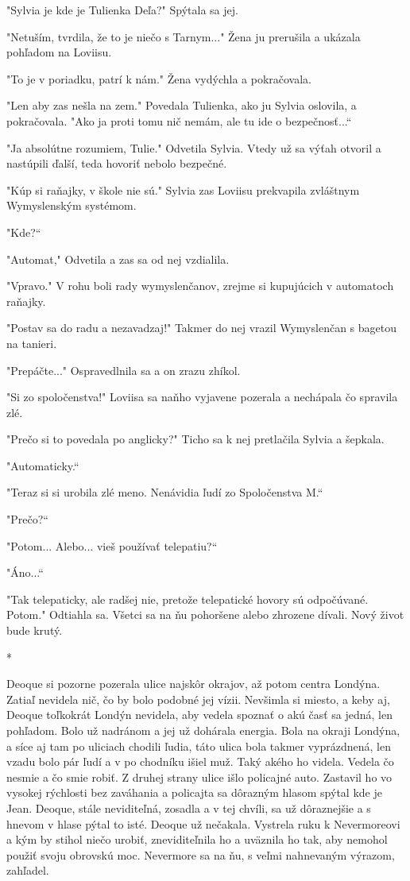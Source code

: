 \documentclass{book}
\begin{document}
"$ $Sylvia je kde je Tulienka Deľa?"$ $ Spýtala sa jej.

"$ $Netuším, tvrdila, že to je niečo s Tarnym..."$ $ Žena ju prerušila a ukázala pohľadom na Loviisu.

"$ $To je v poriadku, patrí k nám."$ $ Žena vydýchla a pokračovala.

"$ $Len aby zas nešla na zem."$ $ Povedala Tulienka, ako ju Sylvia oslovila, a pokračovala. "$ $Ako ja proti tomu nič nemám, ale tu ide o bezpečnosť...“

"$ $Ja absolútne rozumiem, Tulie."$ $ Odvetila Sylvia. Vtedy už sa výťah otvoril a nastúpili ďalší, teda hovoriť nebolo bezpečné.

"$ $Kúp si raňajky, v škole nie sú."$ $ Sylvia zas Loviisu prekvapila zvláštnym Wymyslenským systémom.

"$ $Kde?“

"$ $Automat,"$ $ Odvetila a zas sa od nej vzdialila.

"$ $Vpravo."$ $ V rohu boli rady wymyslenčanov, zrejme si kupujúcich v automatoch raňajky.

"$ $Postav sa do radu a nezavadzaj!"$ $ Takmer do nej vrazil Wymyslenčan s bagetou na tanieri.

"$ $Prepáčte..."$ $ Ospravedlnila sa a on zrazu zhíkol.

"$ $Si zo spoločenstva!"$ $ Loviisa sa naňho vyjavene pozerala a nechápala čo spravila zlé.

"$ $Prečo si to povedala po anglicky?"$ $ Ticho sa k nej pretlačila Sylvia a šepkala.

"$ $Automaticky.“

"$ $Teraz si si urobila zlé meno. Nenávidia ľudí zo Spoločenstva M.“

"$ $Prečo?“

"$ $Potom... Alebo... vieš používať telepatiu?“

"$ $Áno...“

"$ $Tak telepaticky, ale radšej nie, pretože telepatické hovory sú odpočúvané. Potom."$ $ Odtiahla sa. Všetci sa na ňu pohoršene alebo zhrozene dívali. Nový život bude krutý.

\begin{center}
*
\end{center}

Deoque si pozorne pozerala ulice najskôr okrajov, až potom centra Londýna. Zatiaľ nevidela nič, čo by bolo podobné jej vízii. Nevšimla si miesto, a keby aj, Deoque toľkokrát Londýn nevidela, aby vedela spoznať o akú časť sa jedná, len pohľadom. Bolo už nadránom a jej už dohárala energia. Bola na okraji Londýna, a síce aj tam po uliciach chodili ľudia, táto ulica bola takmer vyprázdnená, len vzadu bolo pár ľudí a v po chodníku išiel muž. Taký akého ho videla. Vedela čo nesmie a čo smie robiť. Z druhej strany ulice išlo policajné auto. Zastavil ho vo vysokej rýchlosti bez zaváhania a policajta sa dôrazným hlasom spýtal kde je Jean. Deoque, stále neviditeľná, zosadla a v tej chvíli, sa už dôraznejšie a s hnevom v hlase pýtal to isté. Deoque už nečakala. Vystrela ruku k Nevermoreovi a kým by stihol niečo urobiť, zneviditeľnila ho a uväznila ho tak, aby nemohol použiť svoju obrovskú moc. Nevermore sa na ňu, s veľmi nahnevaným výrazom, zahľadel.
\end{document}
